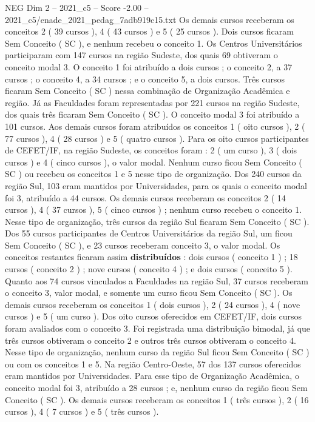 \begin{textsample}{NEG Dim 2 – 2021\_c5 – Score -2.00 – 2021\_c5/enade\_2021\_pedag\_7adb919c15.txt}
Os demais cursos receberam os conceitos 2 ( 39 cursos ), 4 ( 43 cursos ) e 5 ( 25 cursos ).
Dois cursos ficaram Sem Conceito ( SC ), e nenhum recebeu o conceito 1.
Os Centros Universitários participaram com 147 cursos na região Sudeste, dos quais 69 obtiveram o conceito modal 3.
O conceito 1 foi atribuído a dois cursos ; o conceito 2, a 37 cursos ; o conceito 4, a 34 cursos ; e o conceito 5, a dois cursos.
Três cursos ficaram Sem Conceito ( SC ) nessa combinação de Organização Acadêmica e região.
Já as Faculdades foram representadas por 221 cursos na região Sudeste, dos quais três ficaram Sem Conceito ( SC ).
O conceito modal 3 foi atribuído a 101 cursos.
Aos demais cursos foram atribuídos os conceitos 1 ( oito cursos ), 2 ( 77 cursos ), 4 ( 28 cursos ) e 5 ( quatro cursos ).
Para os oito cursos participantes de CEFET/IF, na região Sudeste, os conceitos foram : 2 ( um curso ), 3 ( dois cursos ) e 4 ( cinco cursos ), o valor modal.
Nenhum curso ficou Sem Conceito ( SC ) ou recebeu os conceitos 1 e 5 nesse tipo de organização.
Dos 240 cursos da região Sul, 103 eram mantidos por Universidades, para os quais o conceito modal foi 3, atribuído a 44 cursos.
Os demais cursos receberam os conceitos 2 ( 14 cursos ), 4 ( 37 cursos ), 5 ( cinco cursos ) ; nenhum curso recebeu o conceito 1.
Nesse tipo de organização, três cursos da região Sul ficaram Sem Conceito ( SC ).
Dos 55 cursos participantes de Centros Universitários da região Sul, um ficou Sem Conceito ( SC ), e 23 cursos receberam conceito 3, o valor modal.
Os conceitos restantes ficaram assim \textbf{distribuídos} : dois cursos ( conceito 1 ) ; 18 cursos ( conceito 2 ) ; nove cursos ( conceito 4 ) ; e dois cursos ( conceito 5 ).
Quanto aos 74 cursos vinculados a Faculdades na região Sul, 37 cursos receberam o conceito 3, valor modal, e somente um curso ficou Sem Conceito ( SC ).
Os demais cursos receberam os conceitos 1 ( dois cursos ), 2 ( 24 cursos ), 4 ( nove cursos ) e 5 ( um curso ).
Dos oito cursos oferecidos em CEFET/IF, dois cursos foram avaliados com o conceito 3.
Foi registrada uma distribuição bimodal, já que três cursos obtiveram o conceito 2 e outros três cursos obtiveram o conceito 4.
Nesse tipo de organização, nenhum curso da região Sul ficou Sem Conceito ( SC ) ou com os conceitos 1 e 5.
Na região Centro-Oeste, 57 dos 137 cursos oferecidos eram mantidos por Universidades.
Para esse tipo de Organização Acadêmica, o conceito modal foi 3, atribuído a 28 cursos ; e, nenhum curso da região ficou Sem Conceito ( SC ).
Os demais cursos receberam os conceitos 1 ( três cursos ), 2 ( 16 cursos ), 4 ( 7 cursos ) e 5 ( três cursos ).

\end{textsample}

